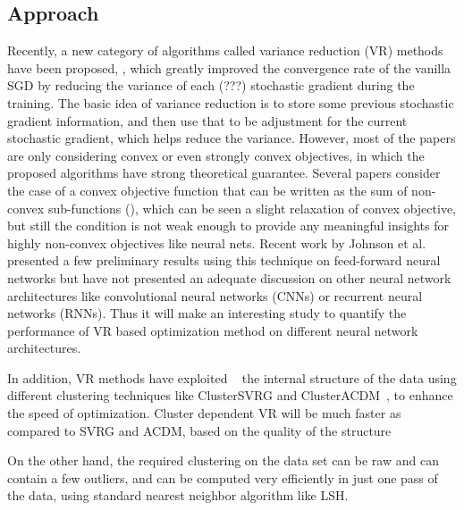 \documentclass{article} %
\begin{document}
\subsection{Approach}
Recently, a new category of algorithms called variance reduction (VR) methods have been proposed, \cite{JohnsonZhang2013-SVRG,Shalev-Shwartz2013-SDCA,Schmidt2013-SAG,Shalev-ShwartzZhang2014-ProxSDCA,XiaoZhang2014-ProximalSVRG,Defazio2014-Finito,Defazio2014-SAGA,Mairal2015-MISO,UniVR, exploitingstructure}, which greatly improved the convergence rate of the vanilla SGD by reducing the variance of each (???) stochastic gradient during the training. The basic idea of variance reduction is to store some previous stochastic gradient information, and then use that to be adjustment for the current stochastic gradient, which helps reduce the variance.
However, most of the papers are only considering convex or even strongly convex objectives, in which the proposed algorithms have strong theoretical guarantee. Several papers consider the case of a convex objective function that can be written as the sum of non-convex sub-functions (\cite{Shalev-Shwartz2015-SDCAwithoutDual,UniVR}), which can be seen a slight relaxation of convex objective, but still the condition is not weak enough to provide any meaningful insights for highly non-convex objectives like neural nets. Recent work by Johnson et al.  \cite{JohnsonZhang2013-SVRG} presented a few preliminary results using this technique on feed-forward neural networks but have not presented an adequate discussion on other neural network architectures like convolutional neural networks (CNNs) or recurrent neural networks (RNNs). %
Thus it will make an interesting study to quantify the performance of VR based optimization method on different neural network architectures. 


In addition, VR methods have exploited ~\cite{exploitingstructure,HLM2015} the internal structure of the data using different clustering techniques like ClusterSVRG and ClusterACDM~\cite{exploitingstructure}, to enhance the speed of optimization. Cluster dependent VR will be much faster as compared to SVRG and ACDM, based on the quality of the structure   

On the other hand, the required clustering on the data set can be raw and can contain a few outliers, and can be computed very efficiently in just one pass of the data, using standard nearest neighbor algorithm like LSH. 
\end{document}
